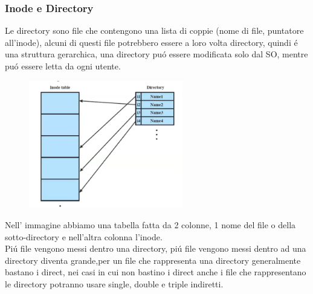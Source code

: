 \subsubsection*{Inode e Directory}
Le directory sono file che contengono una lista di coppie (nome di file, puntatore all'inode), alcuni di questi file potrebbero essere a loro
volta directory, quindi é una struttura gerarchica, una directory puó essere modificata solo dal SO, mentre puó essere letta da ogni utente.
\begin{figure}[H]
    \centering
    \includegraphics[width=0.6\textwidth]{immagini/InodeDirectory}
\end{figure}
Nell' immagine abbiamo una tabella fatta da 2 colonne, 1 nome del file o della sotto-directory e nell'altra colonna l'inode.\\
\newline
Piú file vengono messi dentro una directory, piú file vengono messi dentro ad una directory diventa grande,per un file che rappresenta
una directory generalmente bastano i direct, nei casi in cui non bastino i direct anche i file che rappresentano le directory
potranno usare single, double e triple indiretti.
